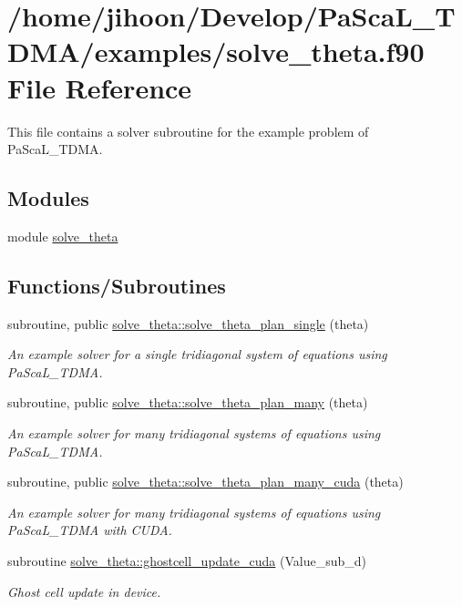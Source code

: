 \hypertarget{solve__theta_8f90}{}\section{/home/jihoon/\+Develop/\+Pa\+Sca\+L\+\_\+\+T\+D\+M\+A/examples/solve\+\_\+theta.f90 File Reference}
\label{solve__theta_8f90}


This file contains a solver subroutine for the example problem of Pa\+Sca\+L\+\_\+\+T\+D\+MA.  


\subsection*{Modules}
\begin{DoxyCompactItemize}
\item 
module \hyperlink{namespacesolve__theta}{solve\+\_\+theta}
\end{DoxyCompactItemize}
\subsection*{Functions/\+Subroutines}
\begin{DoxyCompactItemize}
\item 
subroutine, public \hyperlink{namespacesolve__theta_a215d44e312ec3ab2a3ab44fa0613b100}{solve\+\_\+theta\+::solve\+\_\+theta\+\_\+plan\+\_\+single} (theta)
\begin{DoxyCompactList}\small\item\em An example solver for a single tridiagonal system of equations using Pa\+Sca\+L\+\_\+\+T\+D\+MA. \end{DoxyCompactList}\item 
subroutine, public \hyperlink{namespacesolve__theta_a0b7fdb576c007dc344092bf40efb0f4b}{solve\+\_\+theta\+::solve\+\_\+theta\+\_\+plan\+\_\+many} (theta)
\begin{DoxyCompactList}\small\item\em An example solver for many tridiagonal systems of equations using Pa\+Sca\+L\+\_\+\+T\+D\+MA. \end{DoxyCompactList}\item 
subroutine, public \hyperlink{namespacesolve__theta_a84c4bdc671112259790470f6ad4c7e4c}{solve\+\_\+theta\+::solve\+\_\+theta\+\_\+plan\+\_\+many\+\_\+cuda} (theta)
\begin{DoxyCompactList}\small\item\em An example solver for many tridiagonal systems of equations using Pa\+Sca\+L\+\_\+\+T\+D\+MA with C\+U\+DA. \end{DoxyCompactList}\item 
subroutine \hyperlink{namespacesolve__theta_a75284cf6dd015edde5309be8368c4c9e}{solve\+\_\+theta\+::ghostcell\+\_\+update\+\_\+cuda} (Value\+\_\+sub\+\_\+d)
\begin{DoxyCompactList}\small\item\em Ghost cell update in device. \end{DoxyCompactList}\end{DoxyCompactItemize}


